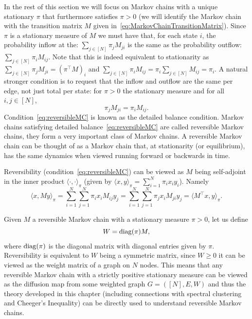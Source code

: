 In the rest of this section we will focus on Markov chains with a unique stationary $\pi$ that furthermore satisfies $\pi>0$ (we will identify the Markov chain with the transition matrix $M$ given in~\eqref{eq:MarkovChainTransitionMatrix}). Since $\pi$ is a stationary measure of $M$ we must have that, for each state $i$, the probability inflow at the: $\sum_{j\in[N]}\pi_jM_{ji}$ is the same as the probability outflow: $\sum_{j\in[N]}\pi_iM_{ij}$. Note that this is indeed equivalent to stationarity as $\sum_{j\in[N]}\pi_jM_{ji}=\left(\pi^\top M\right)_i$ and $\sum_{j\in[N]}\pi_iM_{ij} = \pi_i\sum_{j\in[N]}M_{ij}=\pi_i$. A natural stronger condition is to request that the inflow and outflow are the same per edge, not just total per state: for $\pi>0$ the stationary measure and for all $i,j\in[N]$,
\begin{equation}\label{eq:reversibleMC}
 \pi_jM_{ji} = \pi_i M_{ij}.
\end{equation}
Condition~\eqref{eq:reversibleMC} is known as the detailed balance condition. Markov chains satisfying detailed balance~\eqref{eq:reversibleMC} are called reversible Markov chains, they form a very important class of Markov chains. A reversible Markov chain can be thought of as a Markov chain that, at stationarity (or equilibrium), has the same dynamics when viewed running forward or backwards in time.

Reversibility (condition~\eqref{eq:reversibleMC}) can be viewed as $M$ being self-adjoint in the inner product $\langle \cdot, \cdot \rangle_\pi$ (given by $\langle x, y \rangle_\pi = \sum_{i=1}^N \pi_i x_i y_i$). Namely 
$$\langle x, My \rangle_\pi = \sum_{i=1}^N\sum_{j=1}^N \pi_i x_i M_{ij}y_j = \sum_{i=1}^N\sum_{j=1}^N \pi_j x_i M_{ji}y_j = \langle M^\top x, y \rangle_\pi.$$

Given $M$ a reversible Markov chain with a stationary measure $\pi>0$, let us define 
\begin{equation}\label{eq:WisdiagpiM}
    W = \operatorname{diag}(\pi)M,
\end{equation}
where $\operatorname{diag}(\pi)$ is the diagonal matrix with diagonal entries given by $\pi$. Reversibility is equivalent to $W$ being a symmetric matrix, since $W\geq 0$ it can be viewed as the weight matrix of a graph on $N$ nodes. This means that any reversible Markov chain with a strictly positive stationary measure can be viewed as the diffusion map from some weighted graph $G=([N],E,W)$ and thus the theory developed in this chapter (including connections with spectral clustering and Cheeger's Inequality) can be directly used to understand reversible Markov chains.


